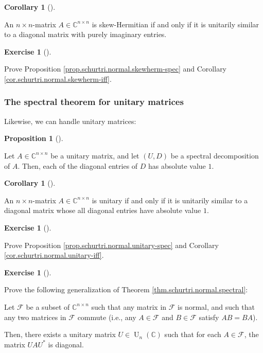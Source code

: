 \documentclass[numbers=enddot,12pt,final,onecolumn,notitlepage]{scrartcl}%
\newcounter{exer}
\numberwithin{exer}{subsection}
\theoremstyle{definition}
\newtheorem{prop}[theo]{Proposition}
\newenvironment{proposition}[1][]
{\begin{prop}[#1]\begin{leftbar}}
{\end{leftbar}\end{prop}}
\newtheorem{coro}[theo]{Corollary}
\newenvironment{corollary}[1][]
{\begin{coro}[#1]\begin{leftbar}}
{\end{leftbar}\end{coro}}
\newtheorem{exmp}[exer]{Exercise}
\newenvironment{exercise}[1][]
{\begin{exmp}[#1]\begin{leftbar}}
{\end{leftbar}\end{exmp}}
\begin{document}
\begin{corollary}
\label{cor.schurtri.normal.skewherm-iff}An $n\times n$-matrix $A\in
\mathbb{C}^{n\times n}$ is skew-Hermitian if and only if it is unitarily
similar to a diagonal matrix with purely imaginary entries.
\end{corollary}

\begin{exercise}
\label{exe.schurtri.normal.skewherm} Prove Proposition
\ref{prop.schurtri.normal.skewherm-spec} and Corollary
\ref{cor.schurtri.normal.skewherm-iff}.
\end{exercise}

\subsubsection{The spectral theorem for unitary matrices}

Likewise, we can handle unitary matrices:

\begin{proposition}
\label{prop.schurtri.normal.unitary-spec}Let $A\in\mathbb{C}^{n\times n}$ be a
unitary matrix, and let $\left(  U,D\right)  $ be a spectral decomposition of
$A$. Then, each of the diagonal entries of $D$ has absolute value $1$.
\end{proposition}

\begin{corollary}
\label{cor.schurtri.normal.unitary-iff}An $n\times n$-matrix $A\in
\mathbb{C}^{n\times n}$ is unitary if and only if it is unitarily similar to a
diagonal matrix whose all diagonal entries have absolute value $1$.
\end{corollary}

\begin{exercise}
\label{exe.schurtri.normal.unitary} Prove Proposition
\ref{prop.schurtri.normal.unitary-spec} and Corollary
\ref{cor.schurtri.normal.unitary-iff}.
\end{exercise}

\begin{exercise}
\label{exe.schurtri.normal.F} Prove the following generalization of
Theorem \ref{thm.schurtri.normal.spectral}:

Let $\mathcal{F}$ be a subset of $\mathbb{C}^{n\times n}$ such that any matrix
in $\mathcal{F}$ is normal, and such that any two matrices in $\mathcal{F}$
commute (i.e., any $A\in\mathcal{F}$ and $B\in\mathcal{F}$ satisfy $AB=BA$).

Then, there exists a unitary matrix $U\in\operatorname*{U}\nolimits_{n}\left(
\mathbb{C}\right)  $ such that for each $A\in\mathcal{F}$, the matrix
$UAU^{\ast}$ is diagonal.
\end{exercise}
\end{document}
